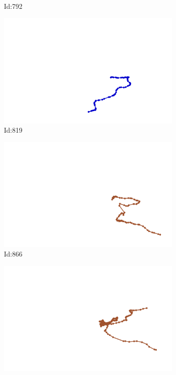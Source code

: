 \documentclass[12pt,twoside]{report}
\begin{document}
\begin{figure}
\begin{subfigure}[b]{0.20\textwidth}
\caption{Id:792}
\end{subfigure}
\begin{subfigure}[b]{0.20\textwidth}
\centering
\includegraphics[width=\textwidth]{../trajectories/819.png}
\caption{Id:819}
\end{subfigure}
\begin{subfigure}[b]{0.20\textwidth}
\centering
\includegraphics[width=\textwidth]{../trajectories/866.png}
\caption{Id:866}
\end{subfigure}
\begin{subfigure}[b]{0.20\textwidth}
\centering
\includegraphics[width=\textwidth]{../trajectories/894.png}

\end{subfigure}
\end{figure}
\end{document}
